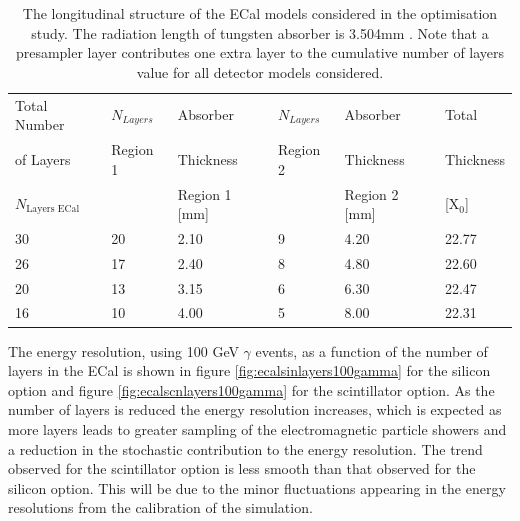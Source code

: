 \begin{table}[h!]
\centering
\begin{tabular}{ l l l l l l}
\hline
Total Number & $N_{Layers}$ & Absorber & $N_{Layers}$ & Absorber & Total  \\
of Layers & Region 1 & Thickness & Region 2 & Thickness & Thickness \\
$N_{\text{Layers ECal}}$ & & Region 1 [mm] & &  Region 2 [mm] &  [$\text{X}_{0}$] \\
\hline
30 & 20 & 2.10 & 9 & 4.20 & 22.77 \\
26 & 17 & 2.40 & 8 & 4.80 & 22.60 \\
20 & 13 & 3.15 & 6 & 6.30 & 22.47 \\
16 & 10 & 4.00 & 5 & 8.00 & 22.31\\
\hline
\end{tabular}
\caption[The longitudinal structure of the ECal models considered in the optimisation study.  The radiation length of tungsten absorber is 3.504mm \cite{Olive:2016xmw}.  Note that a presampler layer contributes one extra layer to the cumulative number of layers value for all detector models considered.]{The longitudinal structure of the ECal models considered in the optimisation study.  The radiation length of tungsten absorber is 3.504mm \cite{Olive:2016xmw}.  Note that a presampler layer contributes one extra layer to the cumulative number of layers value for all detector models considered.}
\label{table:nlayersecaloption}
\end{table}

The energy resolution, using 100 GeV $\gamma$ events, as a function of the number of layers in the ECal is shown in figure \ref{fig:ecalsinlayers100gamma} for the silicon option and figure \ref{fig:ecalscnlayers100gamma} for the scintillator option.  As the number of layers is reduced the energy resolution increases, which is expected as more layers leads to greater sampling of the electromagnetic particle showers and a reduction in the stochastic contribution to the energy resolution.  The trend observed for the scintillator option is less smooth than that observed for the silicon option.  This will be due to the minor fluctuations appearing in the energy resolutions from the calibration of the simulation.   

